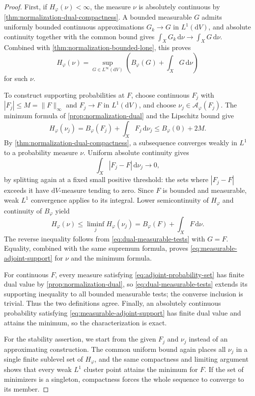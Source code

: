 \begin{proof}
First, if $H_\varphi(\nu)<\infty$, the measure $\nu$ is absolutely continuous by \cref{thm:normalization-dual-compactness}. A bounded measurable $G$ admits uniformly bounded continuous approximations $G_k\to G$ in $L^1(\mathrm{d}V)$, and absolute continuity together with the common bound gives $\int_XG_k\,\mathrm{d}\nu\to\int_XG\,\mathrm{d}\nu$. Combined with \cref{thm:normalization-bounded-lone}, this proves
\begin{equation}\label{eq:dual-measurable-tests}
 H_\varphi(\nu)
 =\sup_{G\in L^\infty(\mathrm{d}V)}
       \left(B_\varphi(G)+\int_XG\,\mathrm{d}\nu\right)
\end{equation}
for such $\nu$.

To construct supporting probabilities at $F$, choose continuous $F_j$ with $|F_j|\leq M=\|F\|_\infty$ and $F_j\to F$ in $L^1(\mathrm{d}V)$, and choose $\nu_j\in\mathcal A_\varphi(F_j)$. The minimum formula of \cref{prop:normalization-dual} and the Lipschitz bound give
\[
 H_\varphi(\nu_j)
 =B_\varphi(F_j)+\int_XF_j\,\mathrm{d}\nu_j
 \leq B_\varphi(0)+2M.
\]
By \cref{thm:normalization-dual-compactness}, a subsequence converges weakly in $L^1$ to a probability measure $\nu$. Uniform absolute continuity gives
\[
 \int_X|F_j-F|\,\mathrm{d}\nu_j\longrightarrow0,
\]
by splitting again at a fixed small positive threshold: the sets where $|F_j-F|$ exceeds it have $\mathrm{d}V$-measure tending to zero. Since $F$ is bounded and measurable, weak $L^1$ convergence applies to its integral. Lower semicontinuity of $H_\varphi$ and continuity of $B_\varphi$ yield
\[
 H_\varphi(\nu)
 \leq\liminf_j H_\varphi(\nu_j)
 =B_\varphi(F)+\int_XF\,\mathrm{d}\nu.
\]
The reverse inequality follows from \eqref{eq:dual-measurable-tests} with $G=F$. Equality, combined with the same supremum formula, proves \eqref{eq:measurable-adjoint-support} for $\nu$ and the minimum formula.

For continuous $F$, every measure satisfying \eqref{eq:adjoint-probability-set} has finite dual value by \cref{prop:normalization-dual}, so \eqref{eq:dual-measurable-tests} extends its supporting inequality to all bounded measurable tests; the converse inclusion is trivial. Thus the two definitions agree. Finally, an absolutely continuous probability satisfying \eqref{eq:measurable-adjoint-support} has finite dual value and attains the minimum, so the characterization is exact.

For the stability assertion, we start from the given $F_j$ and $\nu_j$ instead of an approximating construction. The common uniform bound again places all $\nu_j$ in a single finite sublevel set of $H_\varphi$, and the same compactness and limiting argument shows that every weak $L^1$ cluster point attains the minimum for $F$. If the set of minimizers is a singleton, compactness forces the whole sequence to converge to its member.
\end{proof}

